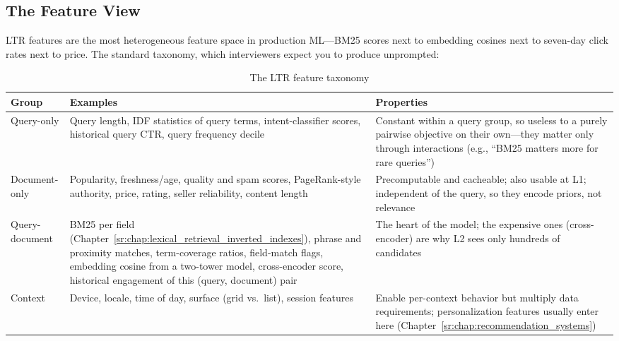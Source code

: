 \subsection{The Feature View}

LTR features are the most heterogeneous feature space in production ML---BM25 scores next to embedding cosines next to seven-day click rates next to price. The standard taxonomy, which interviewers expect you to produce unprompted:

\begin{table}[H]
\centering
\small
\caption{The LTR feature taxonomy}
\label{sr:tab:ltr_features}
\begin{tabularx}{\textwidth}{lXX}
\toprule
\textbf{Group} & \textbf{Examples} & \textbf{Properties} \\
\midrule
Query-only & Query length, IDF statistics of query terms, intent-classifier scores, historical query CTR, query frequency decile & Constant within a query group, so useless to a purely pairwise objective on their own---they matter only through interactions (e.g., ``BM25 matters more for rare queries'') \\
Document-only & Popularity, freshness/age, quality and spam scores, PageRank-style authority, price, rating, seller reliability, content length & Precomputable and cacheable; also usable at L1; independent of the query, so they encode priors, not relevance \\
Query-document & BM25 per field (Chapter~\ref{sr:chap:lexical_retrieval_inverted_indexes}), phrase and proximity matches, term-coverage ratios, field-match flags, embedding cosine from a two-tower model, cross-encoder score, historical engagement of this (query, document) pair & The heart of the model; the expensive ones (cross-encoder) are why L2 sees only hundreds of candidates \\
Context & Device, locale, time of day, surface (grid vs.\ list), session features & Enable per-context behavior but multiply data requirements; personalization features usually enter here (Chapter~\ref{sr:chap:recommendation_systems}) \\
\bottomrule
\end{tabularx}
\end{table}

